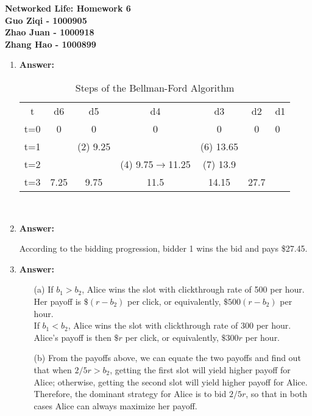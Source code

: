 \documentclass[12pt]{article}
\begin{document}
\begin{center}
\large\bf Networked Life: Homework 6
\medskip\\
Guo Ziqi - 1000905\\
Zhao Juan - 1000918\\
Zhang Hao - 1000899
\end{center}

\begin{enumerate}

\item{} \textbf{Answer:}\\
\begin{table}[ht]
\caption{Steps of the Bellman-Ford Algorithm}
\centering
\begin{tabular}{c c c c c c}
\hline\hline
t & d6 & d5 & d4 & d3 & d2 & d1\\ [0.5ex]
t=0 & 0 & 0 & 0 & 0 & 0 & 0\\
t=1 &  & (2) 9.25 &  & (6) 13.65 & &\\
t=2 &  &  & (4) 9.75$\rightarrow$11.25 & (7) 13.9 & &\\
t=3 & 7.25 & 9.75 & 11.5 & 14.15 & 27.7 &\\
\hline
\end{tabular}
\label{table: running time}
\end{table}\\

\item{} \textbf{Answer:}

According to the bidding progression, bidder 1 wins the bid and pays \$27.45.

\item{} \textbf{Answer:}
\begin{itemize}
\item[(a)] If $b_1>b_2$, Alice wins the slot with clickthrough rate of 500 per hour. Her payoff is $\$(r-b_2)$ per click, or equivalently, $\$500(r-b_2)$ per hour.
\medskip\\
If $b_1<b_2$, Alice wins the slot with clickthrough rate of 300 per hour. Alice's payoff is then $\$r$ per click, or equivalently, $\$300r$ per hour.
\item[(b)] From the payoffs above, we can equate the two payoffs and find out that when $2/5r>b_2$, getting the first slot will yield higher payoff for Alice; otherwise, getting the second slot will yield higher payoff for Alice. Therefore, the dominant strategy for Alice is to bid $2/5r$, so that in both cases Alice can always maximize her payoff. 
\end{itemize}


\end{enumerate}
\end{document}
